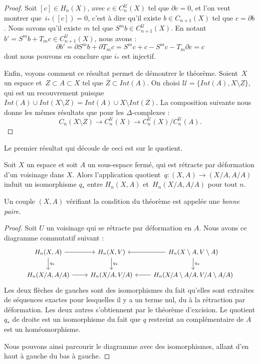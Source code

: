 \begin{proof}
Soit $[c]\in H_n(X)$, avec $c\in C_n^\mathcal{U}(X)$ tel que $\partial c=0$, et l'on veut montrer que~$i_\ast([c])=0$, c'est à dire qu'il existe $b\in C_{n+1}(X)$ tel que $c=\partial b$. Nous savons qu'il existe $m$ tel que $S^mb\in C_{n+1}^\mathcal{U}(X)$. En notant $b'=S^mb+T_mc\in C_{n+1}^\mathcal{U}(X)$, nous avons : \[
\partial b'=\partial S^mb+\partial T_mc=S^mc+c-S^mc-T_m\partial c=c\]dont nous pouvons en conclure que $i_\ast$ est injectif.

\bigskip Enfin, voyons comment ce résultat permet de démontrer le théorème. Soient~$X$ un espace et~${Z\subset A\subset X}$ tel que $\overline{Z}\subset Int(A)$. On choisi $\mathcal{U}=\{Int(A),X\setminus Z\}$, qui est un recouvrement puisque $Int(A)\cup Int(X\setminus Z)=Int(A)\cup X\setminus Int(Z)$. La composition suivante nous donne les mêmes résultats que pour les $\Delta$-complexes :$$C_n(X\setminus Z)\to C_n^\mathcal{U}(X)\to C_n^\mathcal{U}(X)/C_n^\mathcal{U}(A).$$
\end{proof}

Le premier résultat qui découle de ceci est sur le quotient.

\begin{proposition}
Soit $X$ un espace et soit $A$ un sous-espace fermé, qui est rétracte par déformation d'un voisinage dans $X$. Alors l'application quotient~$q:(X,A)\to (X/A,A/A)$ induit un isomorphisme $q_\ast$ entre $H_n(X,A)$ et~$H_n(X/A,A/A)$ pour tout $n$.
\end{proposition}

Un couple $(X,A)$ vérifiant la condition du théorème est appelée une \emph{bonne paire}.

\begin{proof}
Soit $U$ un voisinage qui se rétracte par déformation en $A$. Nous avons ce diagramme commutatif suivant : \[\small\begin{tikzcd}
H_n(X,A)\arrow[d,"q_\ast"]\arrow[r]&H_n(X,V)\arrow[d,"q_\ast"]&H_n(X\setminus A,V\setminus A)\arrow[d,"q_\ast"]\arrow[l]\\
H_n(X/A,A/A)\arrow[r]&H_n(X/A,V/A)&H_n(X/A\setminus A/A,V/A\setminus A/A)\arrow[l]
\end{tikzcd}\]Les deux flèches de gauches sont des isomorphismes du fait qu'elles sont extraites de séquences exactes pour lesquelles il y a un terme nul, du à la rétraction par déformation. Les deux autres s'obtiennent par le théorème d'excision. Le quotient $q_\ast$ de droite est un isomorphisme du fait que $q$ restreint au complémentaire de $A$ est un homéomorphisme.

Nous pouvons ainsi parcourir le diagramme avec des isomorphismes, allant d'en haut à gauche du bas à gauche.
\end{proof}

